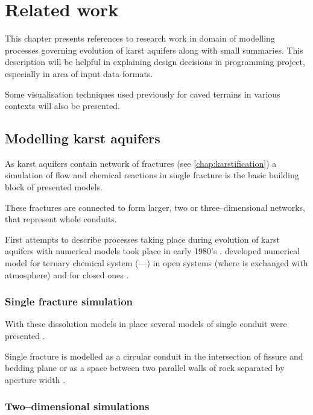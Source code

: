 \chapter{Related work}
\label{chap:related}

This chapter presents references to research work in domain of modelling processes
governing evolution of karst aquifers along with small summaries. This
description will be helpful in explaining design decisions in programming project,
especially in area of input data formats.

Some visualisation techniques used previously for caved terrains in various
contexts will also be presented.

\section{Modelling karst aquifers}

As karst aquifers contain network of fractures (see \autoref{chap:karstification})
a simulation of flow and chemical reactions in single fracture is the basic
building block of presented models.

These fractures are connected to form larger, two or three--dimensional networks,
that represent whole conduits.

First attempts to describe processes taking place during evolution of karst
aquifers with numerical models took place in early 1980's \parencite[p. 3]{hiller2013}.
\Cite{Buhmann1985189} developed numerical model for ternary chemical system
(----) in open systems (where  is exchanged
with atmosphere) and for closed ones \parencite{Buhmann1985109}.

\subsection{Single fracture simulation}

With these dissolution models in place several models of single conduit were
presented \parencite[pp. 4]{hiller2013}.

Single fracture is modelled as a circular conduit in the intersection
of fissure and bedding plane \parencite{Kaufmann200962} or as a space between
two parallel walls of rock separated by aperture width \parencite{dreybrodt2002}.

\subsection{Two--dimensional simulations}

